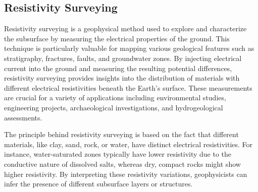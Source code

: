 \documentclass[12pt,a4paper]{report}
\begin{document}
\subsection{Resistivity Surveying}
Resistivity surveying is a geophysical method used to explore and characterize the subsurface by measuring the electrical properties of the ground. This technique is particularly valuable for mapping various geological features such as stratigraphy, fractures, faults, and groundwater zones. By injecting electrical current into the ground and measuring the resulting potential differences, resistivity surveying provides insights into the distribution of materials with different electrical resistivities beneath the Earth's surface. These measurements are crucial for a variety of applications including environmental studies, engineering projects, archaeological investigations, and hydrogeological assessments.

The principle behind resistivity surveying is based on the fact that different materials, like clay, sand, rock, or water, have distinct electrical resistivities. For instance, water-saturated zones typically have lower resistivity due to the conductive nature of dissolved salts, whereas dry, compact rocks might show higher resistivity. By interpreting these resistivity variations, geophysicists can infer the presence of different subsurface layers or structures.
\end{document}
